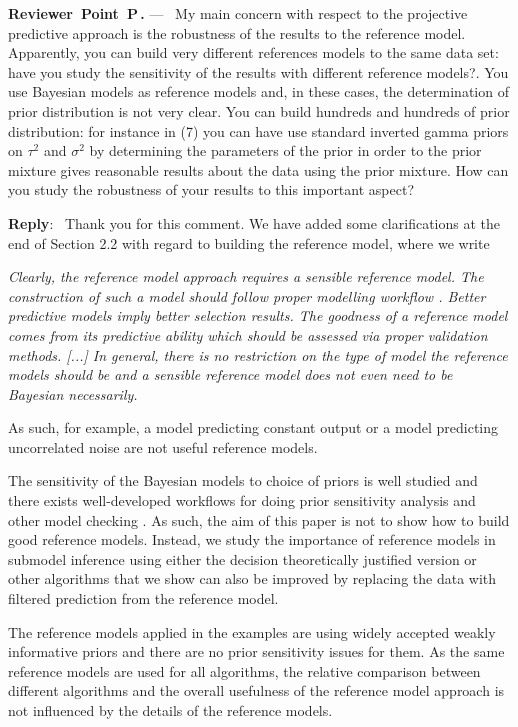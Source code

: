 \documentclass[11pt]{article}
\newcounter{reviewer}
\newcounter{point}[reviewer]
\renewcommand{\thepoint}{P\,\thereviewer.\arabic{point}}
\newenvironment{point}
   {\refstepcounter{point} \bigskip \noindent \begin{sf}{\textbf{Reviewer~Point~\thepoint} } ---\ }
   {\par \end{sf}}
\newenvironment{reply}
   {\medskip \noindent \textbf{Reply}:\  }
   {\medskip}
\begin{document}
\begin{point}
My main concern with respect to the projective predictive approach is the robustness of the results to the reference model. Apparently, you can build very different references models to the same data set: have you study the sensitivity of the results with different reference models?. You use Bayesian models as reference models and, in these cases, the determination of prior distribution is not very clear. You can build hundreds and hundreds of prior distribution: for instance in (7) you can have use standard inverted gamma priors on $\tau^2$ and $\sigma^2$ by determining the parameters of the prior in order to the prior mixture gives reasonable results about the data using the prior mixture. How can you study the robustness of your results to this important aspect?
\end{point}

\begin{reply}
Thank you for this comment. We have added some clarifications at the end of Section 2.2 with regard to building the reference model, where we write

\vspace{0.5\baselineskip}
\textit{
Clearly, the reference model approach requires a sensible reference model. The construction of such a model should follow proper modelling workflow \citep[see, e.g.][]{gelman2020bayesian}. Better predictive models imply better selection results. The goodness of a reference model comes from its predictive ability which should be assessed via proper validation methods. [...] In general, there is no restriction on the type of model the reference models should be and a sensible reference model does not even need to be Bayesian necessarily.
}
\vspace{0.5\baselineskip}

As such, for example, a model predicting constant output or a model predicting uncorrelated noise are not useful reference models.

The sensitivity of the Bayesian models to choice of priors is well studied and there exists well-developed workflows for doing prior sensitivity analysis and other model checking \citep[see, e.g.][]{gelman2020bayesian}. As such, the aim of this paper is not to show how to build good reference models. Instead, we study the importance of reference models in submodel inference using either the decision theoretically justified version or other algorithms that we show can also be improved by replacing the data with filtered prediction from the reference model. 

The reference models applied in the examples are using widely accepted weakly informative priors and there are no prior sensitivity issues for them. As the same reference models are used for all algorithms, the relative comparison between different algorithms and the overall usefulness of the reference model approach is not influenced by the details of the reference models.
\end{reply}
\end{document}
